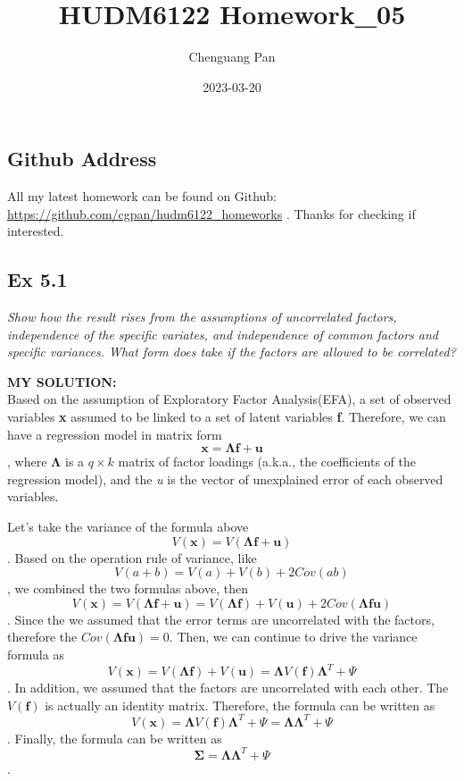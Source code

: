 \documentclass[
]{article}
\title{HUDM6122 Homework\_05}
\author{Chenguang Pan}
\date{2023-03-20}
\begin{document}
\maketitle

\hypertarget{github-address}{%
\subsection{Github Address}\label{github-address}}

All my latest homework can be found on Github:
\url{https://github.com/cgpan/hudm6122_homeworks} . Thanks for checking
if interested.

\hypertarget{ex-5.1}{%
\subsection{Ex 5.1}\label{ex-5.1}}

\emph{Show how the result rises from the assumptions of uncorrelated
factors, independence of the specific variates, and independence of
common factors and specific variances. What form does take if the
factors are allowed to be correlated?}

\textbf{MY SOLUTION:}\\
Based on the assumption of Exploratory Factor Analysis(EFA), a set of
observed variables \textbf{x} assumed to be linked to a set of latent
variables \textbf{f}. Therefore, we can have a regression model in
matrix form
\[\boldsymbol x=\boldsymbol\Lambda \boldsymbol f + \boldsymbol u\],
where \(\boldsymbol \Lambda\) is a \(q \times k\) matrix of factor
loadings (a.k.a., the coefficients of the regression model), and the
\emph{u} is the vector of unexplained error of each observed variables.

Let's take the variance of the formula above
\[V(\boldsymbol x) = V(\boldsymbol\Lambda \boldsymbol f + \boldsymbol u)\].
Based on the operation rule of variance, like
\[V(a+b)= V(a) + V(b) + 2Cov(ab)\], we combined the two formulas above,
then
\[V(\boldsymbol x) = V(\boldsymbol\Lambda \boldsymbol f + \boldsymbol u) = V(\boldsymbol\Lambda \boldsymbol f) + V(\boldsymbol u) + 2 Cov(\boldsymbol\Lambda \boldsymbol f \boldsymbol u)\].
Since the we assumed that the error terms are uncorrelated with the
factors, therefore the
\(Cov(\boldsymbol\Lambda \boldsymbol f \boldsymbol u)=0\). Then, we can
continue to drive the variance formula as
\[V(\boldsymbol x) = V(\boldsymbol\Lambda \boldsymbol f) + V(\boldsymbol u) = \boldsymbol\Lambda V(\boldsymbol f) \boldsymbol\Lambda^T + \Psi\].
In addition, we assumed that the factors are uncorrelated with each
other. The \(V(\boldsymbol f)\) is actually an identity matrix.
Therefore, the formula can be written as
\[V(\boldsymbol x) = \boldsymbol\Lambda V(\boldsymbol f) \boldsymbol\Lambda^T + \Psi = \boldsymbol\Lambda \boldsymbol\Lambda^T + \Psi\].
Finally, the formula can be written as
\[\boldsymbol \Sigma = \boldsymbol\Lambda \boldsymbol\Lambda^T + \Psi\].
\end{document}
